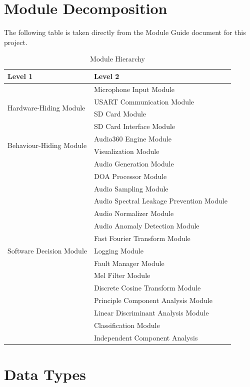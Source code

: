 \documentclass[12pt, titlepage]{article}
\begin{document}
\section{Module Decomposition}

The following table is taken directly from the Module Guide document for this
project.

\begin{table}[H]
\centering
\begin{tabular}{p{} p{}}
\toprule
\textbf{Level 1} & \textbf{Level 2}\\
\midrule

\multirow{4}{0.3\textwidth}{Hardware-Hiding Module}
& Microphone Input Module\\ 
& USART Communication Module \\
& SD Card Module \\
& SD Card Interface Module \\
\midrule

\multirow{2}{0.3\textwidth}{Behaviour-Hiding Module}
& Audio360 Engine Module\\
& Visualization Module\\
\midrule

\multirow{15}{0.3\textwidth}{Software Decision Module}
& Audio Generation Module\\
& DOA Processor Module\\
& Audio Sampling Module\\
& Audio Spectral Leakage Prevention Module\\
& Audio Normalizer Module\\
& Audio Anomaly Detection Module\\
& Fast Fourier Transform Module\\
& Logging Module\\
& Fault Manager Module\\
& Mel Filter Module\\
& Discrete Cosine Transform Module \\
& Principle Component Analysis Module \\
& Linear Discriminant Analysis Module \\
& Classification Module \\
& Independent Component Analysis\\
\bottomrule
\end{tabular}
\caption{Module Hierarchy}
\label{TblMH}
\end{table}

\newpage
\section{Data Types}
\end{document}
